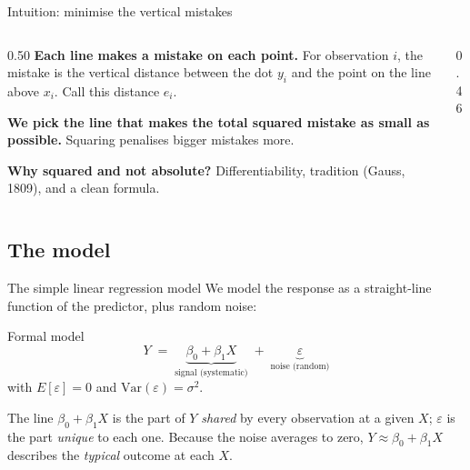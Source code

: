\documentclass[aspectratio=169,11pt]{beamer}
\begin{document}
\begin{frame}{Intuition: minimise the vertical mistakes}
  \begin{columns}[T]
    \begin{column}{0.50\textwidth}
      \textbf{Each line makes a mistake on each point.}
      For observation $i$, the mistake is the vertical distance
      between the dot $y_i$ and the point on the line above $x_i$.
      Call this distance $e_i$.\par\medskip
      \textbf{We pick the line that makes the total squared
      mistake as small as possible.} Squaring penalises bigger
      mistakes more.\par\medskip
      \textbf{Why squared and not absolute?} Differentiability,
      tradition (Gauss, 1809), and a clean formula.
    \end{column}
    \begin{column}{0.46\textwidth}
    \end{column}
  \end{columns}
\end{frame}

\subsection{The model}

\begin{frame}{The simple linear regression model}
  We model the response as a straight-line function of the predictor,
  plus random noise:
  \begin{block}{Formal model}
    \[
      \boxed{\,Y \;=\; \underbrace{\beta_0 + \beta_1 X}_{\text{signal (systematic)}}
             \;+\; \underbrace{\varepsilon}_{\text{noise (random)}}\,}
    \]
    with $E[\varepsilon] = 0$ and $\mathrm{Var}(\varepsilon) = \sigma^2$.
  \end{block}
  \begin{takeaway}
    The line $\beta_0+\beta_1X$ is the part of $Y$ \emph{shared} by every
    observation at a given $X$; $\varepsilon$ is the part \emph{unique} to
    each one. Because the noise averages to zero, $Y \approx \beta_0 +
    \beta_1 X$ describes the \emph{typical} outcome at each $X$.
  \end{takeaway}
\end{frame}
\end{document}
